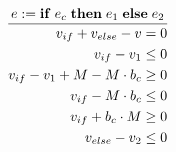{\begin{figure}[t]
\begin{minipage}{0.4\linewidth}
\begin{gather*}
  \end{gather*}
  \end{minipage}
  \begin{minipage}{0.49\linewidth}
    \[
      \frac{\expr \defas \sqlCase{\expr_c}{\expr_1}{\expr_2}}{
      \begin{aligned}
        \var_{if} + \var_{else} - \var                             & = 0    \\
        \var_{if} - \var_1                                         & \leq 0 \\
        \var_{if} - \var_1 + \upBound - \upBound \cdot \bvar_{c}   & \geq 0 \\
        \var_{if} - \upBound  \cdot \bvar_{c}                      & \leq 0 \\
        \var_{if} + \bvar_{c}  \cdot \upBound                      & \geq 0 \\
        \var_{else} - \var_2                                       & \leq 0 \\

\end{aligned}}\]
\end{minipage}
\end{figure}}

